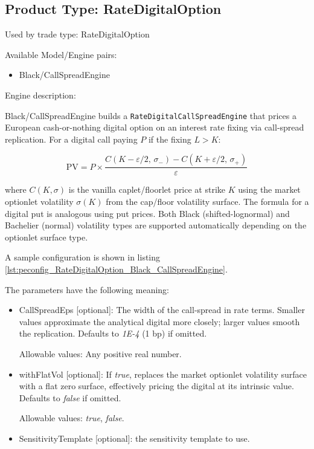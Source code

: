 \subsection{Product Type: RateDigitalOption}

Used by trade type: RateDigitalOption

Available Model/Engine pairs:

\begin{itemize}
\item Black/CallSpreadEngine
\end{itemize}

Engine description:

Black/CallSpreadEngine builds a \lstinline!RateDigitalCallSpreadEngine! that prices a European cash-or-nothing digital
option on an interest rate fixing via call-spread replication. For a digital call paying $P$ if the fixing $L > K$:

$$\text{PV} = P \times \frac{C(K - \varepsilon/2,\, \sigma_{-}) - C(K + \varepsilon/2,\, \sigma_{+})}{\varepsilon}$$

where $C(K, \sigma)$ is the vanilla caplet/floorlet price at strike $K$ using the market optionlet volatility $\sigma(K)$
from the cap/floor volatility surface. The formula for a digital put is analogous using put prices. Both Black
(shifted-lognormal) and Bachelier (normal) volatility types are supported automatically depending on the optionlet
surface type.

A sample configuration is shown in listing
\ref{lst:peconfig_RateDigitalOption_Black_CallSpreadEngine}.

The parameters have the following meaning:

\begin{itemize}
\item CallSpreadEps [optional]: The width of the call-spread in rate terms. Smaller values approximate the analytical
  digital more closely; larger values smooth the replication. Defaults to \emph{1E-4} (1 bp) if omitted.

  Allowable values: Any positive real number.

\item withFlatVol [optional]: If \emph{true}, replaces the market optionlet volatility surface with a flat zero surface,
  effectively pricing the digital at its intrinsic value. Defaults to \emph{false} if omitted.

  Allowable values: \emph{true}, \emph{false}.

\item SensitivityTemplate [optional]: the sensitivity template to use.
\end{itemize}

